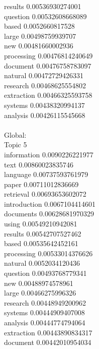 \documentclass{article}
\begin{document}
{results 0.00536930274001\\
question 0.00532608668089\\
based 0.0052660817528\\
large 0.00498759939707\\
new 0.00481660002936\\
processing 0.00476814240649\\
document 0.00476758783097\\
natural 0.00472729426331\\
research 0.00468625554802\\
extraction 0.00466325593758\\
systems 0.00438320994137\\
analysis 0.00426115545668\\
\\
Global:\\
Topic 5\\
information 0.0090226221977\\
text 0.00860023835746\\
language 0.00737593761979\\
paper 0.00711012836669\\
retrieval 0.00693653602072\\
introduction 0.0067104414601\\
documents 0.00628681970329\\
using 0.00549210942081\\
results 0.00542707527462\\
based 0.00535642452161\\
processing 0.00533014376626\\
natural 0.0052034120436\\
question 0.00493768779341\\
new 0.00488974578961\\
large 0.00466275996326\\
research 0.00448949200962\\
systems 0.00444909407008\\
analysis 0.00444774794064\\
extraction 0.00443890834317\\
document 0.00442010954034\\

}
\end{document}
